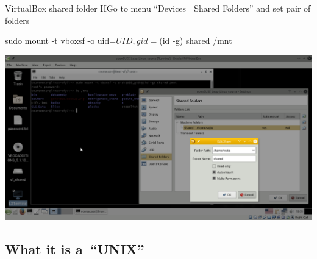 \documentclass[compress, ucs, xelatex, 11pt, xcolor=svgnames,
  hyperref={
    bookmarks=true,
    unicode=true,
    colorlinks=true,
    pdftitle={Linux, command line and MetaCentrum},
    plainpages=false,
    pdfauthor={Vojtech Zeisek},
    pdfsubject={Course about use of Linux command line, writing shell scripts and using MetaCentrum of CESNET},
    pdfcreator={XeLaTeX},
    pdfkeywords={Linux, GNU, BASH, shell, command line, MetaCentrum},
    linkcolor=DarkRed,
    anchorcolor=DarkBlue,
    citecolor=Indigo,
    filecolor=NavyBlue,
    menucolor=DarkMagenta,
    urlcolor=DarkBlue,
    pdftex},
  url={hyphens, lowtilde} %
  ]{beamer}
\begin{document}
\begin{frame}[fragile]{VirtualBox shared folder II}{Go to menu ``Devices | Shared Folders'' and set pair of folders}
  \begin{bashcode}
    sudo mount -t vboxsf -o uid=$UID,gid=$(id -g) shared /mnt
  \end{bashcode}
  \vfil
  \begin{center}
    \includegraphics[width=\textwidth-1cm]{virtualbox_shared_folder_2.png}
  \end{center}
  \vfill
\end{frame}

\subsection{What it is a~``UNIX''}
\end{document}
